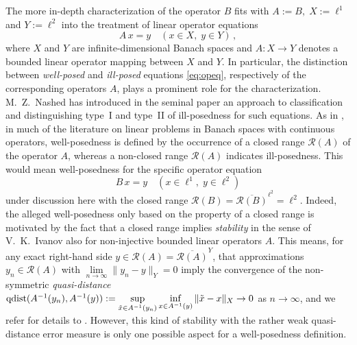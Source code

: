 \documentclass[12pt,twoside,reqno]{amsart}
\theoremstyle{definition}
\numberwithin{equation}{section}
\begin{document}
The more in-depth characterization of the operator $B$ fits with $A:=B,\;X:=\ell^1$ and $Y:=\ell^2$ into the treatment of linear operator equations
\begin{equation}\label{eq:opeq}
A\, x =y  \quad (x \in X,\; y \in Y)\,,
\end{equation}
where $X$ and $Y$ are infinite-dimensional Banach spaces and $A: X \to Y$ denotes a bounded linear operator mapping between $X$ and $Y$. In particular, the distinction between \emph{well-posed}
and \emph{ill-posed} equations \eqref{eq:opeq}, respectively of the corresponding operators $A$, plays a prominent role for the characterization. M.~Z.~Nashed has introduced in the seminal paper \cite{Nashed86}
an approach to classification and distinguishing type~I and type~II of ill-posedness for such equations. \linebreak As in \cite{Nashed86}, in much of the literature on linear problems in Banach spaces with continuous operators, well-posedness is defined by the occurrence of a closed range $\mathcal{R}(A)$ of the operator $A$, whereas a non-closed range $\mathcal{R}(A)$ indicates ill-posedness. This would mean well-posedness for the specific operator equation
\begin{equation}\label{eq:Beq}
B\, x =y  \quad (x \in \ell^1,\; y \in \ell^2)
\end{equation}
under discussion here with the closed range $\mathcal{R}(B)=\overline{\mathcal{R}(B)}^{\ell^2}=\ell^2$. Indeed, the alleged well-posedness only based on the property of a closed range is motivated by the fact that a closed range implies \emph{stability} in the sense of V.~K.~Ivanov \cite{Ivanov63} also for non-injective bounded linear operators $A$. This means, for any exact right-hand side $y \in \mathcal{R}(A)=\overline{\mathcal{R}(A)}^Y$, that approximations $y_n \in \mathcal{R}(A)$ with
$\lim \limits_{n \to \infty} \|y_n-y\|_Y=0$ imply the convergence of the non-symmetric \emph{quasi-distance} ${\rm qdist}(A^{-1}(y_n),A^{-1}(y)):= \sup \limits_{\tilde x \in A^{-1}(y_n)} \inf \limits _{x \in A^{-1}(y)} \|\tilde x -x\|_X \to 0$ as $n \to \infty$, and we refer for details to
\cite[Prop.~1.12]{Flemmingbuch18}. However, this kind of stability with the rather weak quasi-distance error measure is only one possible aspect for a well-posedness definition.
\end{document}
